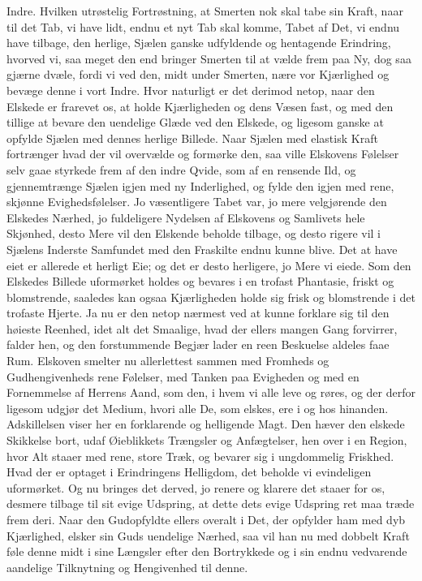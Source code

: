 \documentclass[12pt,a4paper]{book}
\newcommand{\apage}[1]{\marginnote{\footnotesize\textit{[#1]}}}
\begin{document}
Indre. Hvilken utrøstelig Fortrøstning, at Smerten nok skal tabe sin
Kraft, naar til det Tab, vi have lidt, endnu et nyt Tab skal komme, Tabet
af Det, vi endnu have tilbage, den herlige, Sjælen ganske udfyldende og
hentagende Erindring, hvorved vi, saa meget den end bringer Smerten til
at vælde frem paa Ny, dog saa gjærne dvæle, fordi vi ved den, midt under
Smerten, nære vor Kjærlighed og bevæge denne i vort Indre. Hvor naturligt
er det derimod netop, naar den Elskede er frarevet os, at holde
Kjærligheden og dens Væsen fast, og med den tillige at bevare den
uendelige Glæde ved den Elskede, og ligesom ganske at opfylde Sjælen med
dennes herlige Billede. Naar Sjælen med elastisk Kraft fortrænger hvad
der vil overvælde og formørke den, saa ville Elskovens Følelser selv gaae
styrkede frem af den indre Qvide, som af en rensende Ild, og
gjennemtrænge Sjælen igjen med ny Inderlighed, og fylde den igjen med
rene, skjønne Evighedsfølelser. Jo væsentligere Tabet var, jo mere
velgjørende den Elskedes Nærhed, jo fuldeligere Nydelsen af Elskovens og
Samlivets hele Skjønhed, desto Mere vil den Elskende beholde tilbage, og
desto rigere vil i Sjælens Inderste \apage{168} Samfundet med den Fraskilte endnu
kunne blive. Det at have eiet er allerede et herligt Eie; og det er desto
herligere, jo Mere vi eiede. Som den Elskedes Billede uformørket holdes
og bevares i en trofast Phantasie, friskt og blomstrende, saaledes kan
ogsaa Kjærligheden holde sig frisk og blomstrende i det trofaste Hjerte.
Ja nu er den netop nærmest ved at kunne forklare sig til den høieste
Reenhed, idet alt det Smaalige, hvad der ellers mangen Gang forvirrer,
falder hen, og den forstummende Begjær lader en reen Beskuelse aldeles
faae Rum. Elskoven smelter nu allerlettest sammen med Fromheds og
Gudhengivenheds rene Følelser, med Tanken paa Evigheden og med en
Fornemmelse af Herrens Aand, som den, i hvem vi alle leve og røres, og
der derfor ligesom udgjør det Medium, hvori alle De, som elskes, ere i og
hos hinanden. Adskillelsen viser her en forklarende og helligende Magt.
Den hæver den elskede Skikkelse bort, udaf Øieblikkets Trængsler og
Anfægtelser, hen over i en Region, hvor Alt staaer med rene, store Træk,
og bevarer sig i ungdommelig Friskhed. Hvad der er optaget i Erindringens
Helligdom, det beholde vi evindeligen uformørket. Og nu bringes det
derved, jo renere og klarere det staaer for os, desmere tilbage til sit
evige Udspring, at dette dets evige Udspring ret maa træde frem deri. Naar
den Gudopfyldte ellers overalt i Det, der opfylder ham med dyb
Kjærlighed, elsker sin Guds uendelige Nærhed, saa vil han nu med dobbelt
Kraft føle denne \apage{169} midt i sine Længsler efter den Bortrykkede og i sin
endnu vedvarende aandelige Tilknytning og Hengivenhed til denne.
\end{document}
